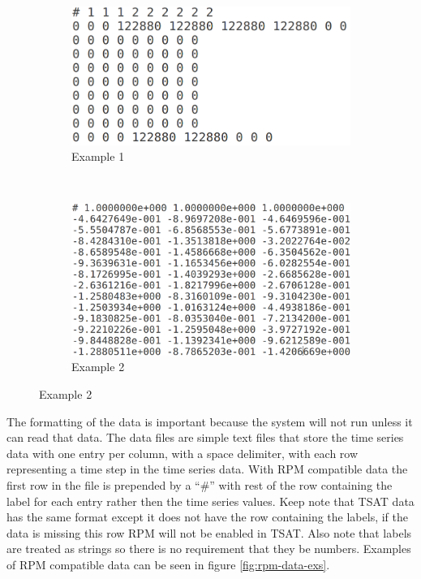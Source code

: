 \documentclass[letterpaper, 12pt]{article}
\begin{document}
\begin{figure}[h]
  \caption{Examples of RPM Data}
  \label{fig:rpm-data-exs}
  \begin{subfigure}[b]{0.5\textwidth}
    \includegraphics[width=\textwidth]{rpm_data_example_1}
    \caption{Example 1}
    \label{fig:rpm-data-ex-1}
  \end{subfigure}
  ~
  \begin{subfigure}[b]{0.5\textwidth}
    \includegraphics[width=\textwidth]{rpm_data_example_2}
    \caption{Example 2}
    \label{fig:rpm-data-ex-2}
  \end{subfigure}
\end{figure}

The formatting of the data is important because the system will not run unless it can read that data. The data files are simple text files that store the time series data with one entry per column, with a space delimiter, with each row representing a time step in the time series data. With RPM compatible data the first row in the file is prepended by a ``\#'' with rest of the row containing the label for each entry rather then the time series values. Keep note that TSAT data has the same format except it does not have the row containing the labels, if the data is missing this row RPM will not be enabled in TSAT. Also note that labels are treated as strings so there is no requirement that they be numbers. Examples of RPM compatible data can be seen in figure \ref{fig:rpm-data-exs}.
\end{document}
